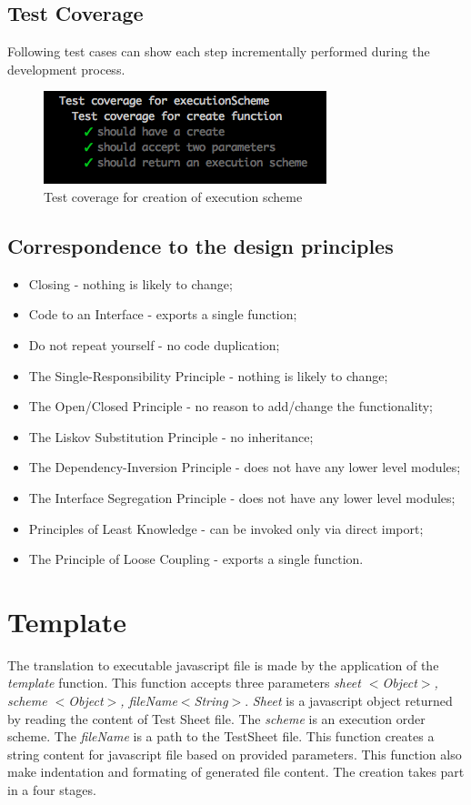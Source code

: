 \subsection{Test Coverage}
Following test cases can show each step incrementally performed during the development process.
\begin{figure}[H]
	\centering
	\includegraphics[width=\linewidth]{grafiken/testCreate.png}
	\caption{Test coverage for creation of execution scheme}
	\label{fig:testCreate}
\end{figure}

\subsection{Correspondence to the design principles}
\begin{itemize}
	\item Closing - nothing is likely to change;
	\item Code to an Interface - exports a single function;
	\item Do not repeat yourself - no code duplication;
	\item The Single-Responsibility Principle - nothing is likely to change;
	\item The Open/Closed Principle - no reason to add/change the functionality;
	\item The Liskov Substitution Principle - no inheritance;
	\item The Dependency-Inversion Principle - does not have any lower level modules;
	\item The Interface Segregation Principle - does not have any lower level modules;
	\item Principles of Least Knowledge -  can be invoked only via direct import;
	\item The Principle of Loose Coupling - exports a single function.
\end{itemize}

\section{Template}
\label{sec:template}
The translation to executable javascript file is made by the application of the \textit{template} function. This function accepts three parameters \textit{sheet $<$Object$>$, scheme $<$Object$>$, fileName$<$String$>$}. \textit{Sheet} is a javascript object returned by reading the content of Test Sheet file. The \textit{scheme} is an execution order scheme. The \textit{fileName} is a path to the TestSheet file. This function creates a string content for javascript file based on provided parameters. This function also make indentation and formating of generated file content. The creation takes part in a four stages. 


